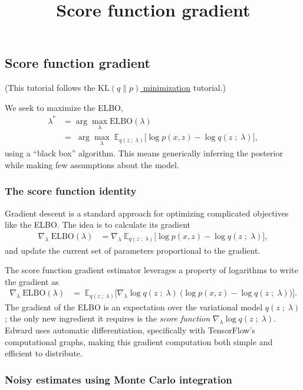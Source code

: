 \title{Score function gradient}

\subsection{Score function gradient}

(This tutorial follows the
\href{tut_KLqp.html}{$\text{KL}(q\|p)$ minimization} tutorial.)

We seek to maximize the ELBO,
\begin{align*}
  \lambda^*
  &=
  \arg \max_\lambda \text{ELBO}(\lambda)\\
  &=\;
  \arg \max_\lambda\;
  \mathbb{E}_{q(z\;;\;\lambda)}
  \big[
  \log p(x, z)
  -
  \log q(z\;;\;\lambda)
  \big],
\end{align*}
using a ``black box'' algorithm. This means generically inferring the
posterior while making few assumptions about the model.

\subsubsection{The score function identity}

Gradient descent is a standard approach for optimizing complicated
objectives like the ELBO. The idea is to calculate its gradient
\begin{align*}
  \nabla_\lambda\;
  \text{ELBO}(\lambda)
  &=
  \nabla_\lambda\;
  \mathbb{E}_{q(z\;;\;\lambda)}
  \big[
  \log p(x, z)
  -
  \log q(z\;;\;\lambda)
  \big],
\end{align*}
and update the current set of parameters proportional to the gradient.

The score function gradient estimator leverages a property of
logarithms to write the gradient as
\begin{align*}
  \nabla_\lambda\;
  \text{ELBO}(\lambda)
  &=\;
  \mathbb{E}_{q(z\;;\;\lambda)}
  \big[
  \nabla_\lambda \log q(z\;;\;\lambda)
  \:
  \big(
  \log p(x, z)
  -
  \log q(z\;;\;\lambda)
  \big)
  \big].
\end{align*}
The gradient of the ELBO is an expectation over the variational
model $q(z\;;\;\lambda)$; the only new ingredient it requires is the
\emph{score function} $\nabla_\lambda \log q(z\;;\;\lambda)$.
Edward uses automatic differentiation, specifically with TensorFlow's
computational graphs, making this gradient computation both simple and
efficient to distribute.

\subsubsection{Noisy estimates using Monte Carlo integration}

